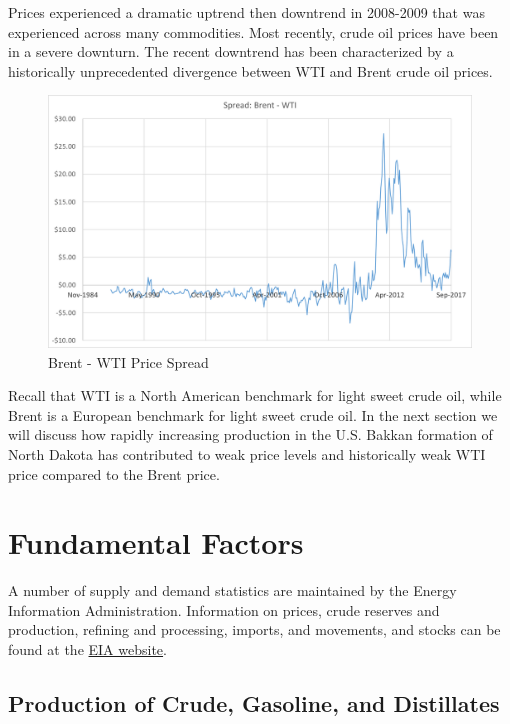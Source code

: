 \documentclass[
  letterpaper,
  DIV=11,
  numbers=noendperiod]{scrreprt}
\begin{document}
Prices experienced a dramatic uptrend then downtrend in 2008-2009 that
was experienced across many commodities. Most recently, crude oil prices
have been in a severe downturn. The recent downtrend has been
characterized by a historically unprecedented divergence between WTI and
Brent crude oil prices.

\begin{figure}

{\centering \includegraphics{Excel-files/CrudeOiland-crudeoil_files/image008.png}

}

\caption{Brent - WTI Price Spread}

\end{figure}

Recall that WTI is a North American benchmark for light sweet crude oil,
while Brent is a European benchmark for light sweet crude oil. In the
next section we will discuss how rapidly increasing production in the
U.S. Bakkan formation of North Dakota has contributed to weak price
levels and historically weak WTI price compared to the Brent price.

\hypertarget{fundamental-factors}{%
\section{Fundamental Factors}\label{fundamental-factors}}

A number of supply and demand statistics are maintained by the Energy
Information Administration. Information on prices, crude reserves and
production, refining and processing, imports, and movements, and stocks
can be found at the \href{http://www.eia.gov/petroleum/data.cfm}{EIA
website}.

\hypertarget{production-of-crude-gasoline-and-distillates}{%
\subsection{Production of Crude, Gasoline, and
Distillates}\label{production-of-crude-gasoline-and-distillates}}
\end{document}
